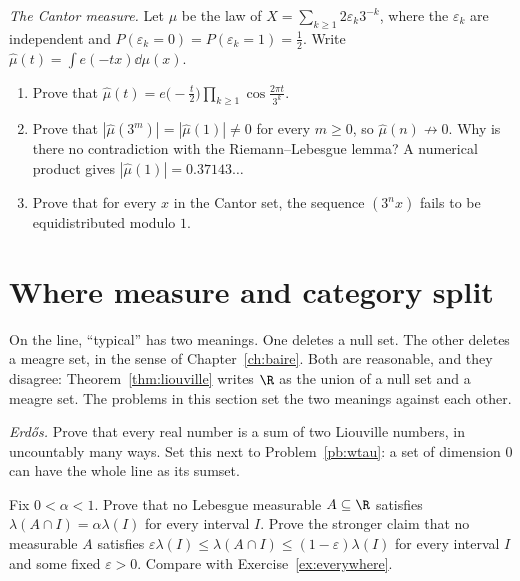 \begin{exercise}[$\star\star$]\label{pb:cantorfourier}
\emph{The Cantor measure.} Let $\mu$ be the law of $X=\sum_{k\ge1}2\varepsilon_k3^{-k}$, where the $\varepsilon_k$ are independent and $P(\varepsilon_k=0)=P(\varepsilon_k=1)=\frac12$. Write $\hat\mu(t)=\int e(-tx)\dd\mu(x)$.
\begin{enumerate}[label=(\alph*)]
\item Prove that $\hat\mu(t)=e\bigl(-\frac t2\bigr)\prod_{k\ge1}\cos\frac{2\pi t}{3^k}$.
\item Prove that $|\hat\mu(3^m)|=|\hat\mu(1)|\ne0$ for every $m\ge0$, so $\hat\mu(n)\not\to0$. Why is there no contradiction with the Riemann--Lebesgue lemma? A numerical product gives $|\hat\mu(1)|=0.37143\ldots$
\item Prove that for every $x$ in the Cantor set, the sequence $(3^nx)$ fails to be equidistributed modulo $1$.
\end{enumerate}
\end{exercise}

\section{Where measure and category split}

On the line, ``typical'' has two meanings. One deletes a null set. The other deletes a meagre set, in the sense of Chapter~\ref{ch:baire}. Both are reasonable, and they disagree: Theorem~\ref{thm:liouville} writes $\R$ as the union of a null set and a meagre set. The problems in this section set the two meanings against each other.

\begin{exercise}[$\star$]\label{pb:erdosL}
\emph{Erdős.} Prove that every real number is a sum of two Liouville numbers, in uncountably many ways. Set this next to Problem~\ref{pb:wtau}: a set of dimension $0$ can have the whole line as its sumset.
\end{exercise}

\begin{exercise}[$\star$]\label{pb:halves}
Fix $0<\alpha<1$. Prove that no Lebesgue measurable $A\subseteq\R$ satisfies $\lambda(A\cap I)=\alpha\lambda(I)$ for every interval $I$. Prove the stronger claim that no measurable $A$ satisfies $\varepsilon\lambda(I)\le\lambda(A\cap I)\le(1-\varepsilon)\lambda(I)$ for every interval $I$ and some fixed $\varepsilon>0$. Compare with Exercise~\ref{ex:everywhere}.
\end{exercise}

